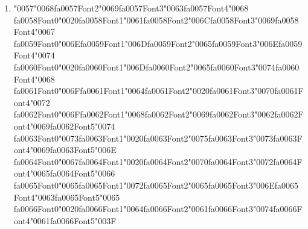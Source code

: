 \documentclass[12pt]{article}
\begin{document}
\begin{enumerate}[label=Q\arabic*.]
\begin{enumerate}[label=(\Alph*)]
    \item Set attention masks during decoding
    \item Collect human preference pairs online
    \item Tune optimizer hyper-parameters each step
    \item Score whole model responses so PPO can assign rewards
\end{enumerate}
\item {\char"0057}{\char"0068}{\csname fa0057Font2\endcsname\char"0069}{\csname fa0057Font3\endcsname\char"0063}{\csname fa0057Font4\endcsname\char"0068} {\csname fa0058Font0\endcsname\char"0020}{\csname fa0058Font1\endcsname\char"0061}{\csname fa0058Font2\endcsname\char"006C}{\csname fa0058Font3\endcsname\char"0069}{\csname fa0058Font4\endcsname\char"0067} {\csname fa0059Font0\endcsname\char"006E}{\csname fa0059Font1\endcsname\char"006D}{\csname fa0059Font2\endcsname\char"0065}{\csname fa0059Font3\endcsname\char"006E}{\csname fa0059Font4\endcsname\char"0074} {\csname fa0060Font0\endcsname\char"0020}{\csname fa0060Font1\endcsname\char"006D}{\csname fa0060Font2\endcsname\char"0065}{\csname fa0060Font3\endcsname\char"0074}{\csname fa0060Font4\endcsname\char"0068} {\csname fa0061Font0\endcsname\char"006F}{\csname fa0061Font1\endcsname\char"0064}{\csname fa0061Font2\endcsname\char"0020}{\csname fa0061Font3\endcsname\char"0070}{\csname fa0061Font4\endcsname\char"0072} {\csname fa0062Font0\endcsname\char"006F}{\csname fa0062Font1\endcsname\char"0068}{\csname fa0062Font2\endcsname\char"0069}{\csname fa0062Font3\endcsname\char"0062}{\csname fa0062Font4\endcsname\char"0069}{\csname fa0062Font5\endcsname\char"0074} {\csname fa0063Font0\endcsname\char"0073}{\csname fa0063Font1\endcsname\char"0020}{\csname fa0063Font2\endcsname\char"0075}{\csname fa0063Font3\endcsname\char"0073}{\csname fa0063Font4\endcsname\char"0069}{\csname fa0063Font5\endcsname\char"006E} {\csname fa0064Font0\endcsname\char"0067}{\csname fa0064Font1\endcsname\char"0020}{\csname fa0064Font2\endcsname\char"0070}{\csname fa0064Font3\endcsname\char"0072}{\csname fa0064Font4\endcsname\char"0065}{\csname fa0064Font5\endcsname\char"0066} {\csname fa0065Font0\endcsname\char"0065}{\csname fa0065Font1\endcsname\char"0072}{\csname fa0065Font2\endcsname\char"0065}{\csname fa0065Font3\endcsname\char"006E}{\csname fa0065Font4\endcsname\char"0063}{\csname fa0065Font5\endcsname\char"0065} {\csname fa0066Font0\endcsname\char"0020}{\csname fa0066Font1\endcsname\char"0064}{\csname fa0066Font2\endcsname\char"0061}{\csname fa0066Font3\endcsname\char"0074}{\csname fa0066Font4\endcsname\char"0061}{\csname fa0066Font5\endcsname\char"003F}

\end{enumerate}
\end{document}
